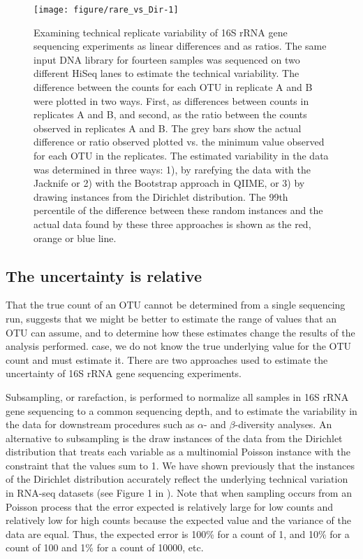 \documentclass[11pt]{article}\usepackage[]{graphicx}\usepackage[]{color}
\makeatletter
\def\maxwidth{ %
  \ifdim\Gin@nat@width>\linewidth
    \linewidth
  \else
    \Gin@nat@width
  \fi
}
\newenvironment{knitrout}{}{} %
\makeatother
\begin{document}
\begin{figure}
\begin{center}

\begin{knitrout}
\color{fgcolor}
\texttt{[image: figure/rare\_vs\_Dir-1]} 

\end{knitrout}
\caption{Examining technical replicate variability of 16S rRNA gene sequencing experiments as linear differences and as ratios. The same input DNA library for fourteen samples was sequenced on two different HiSeq lanes to estimate the technical variability. The difference between the counts for each OTU in replicate A and B were plotted in two ways. First, as differences between counts in replicates A and B, and second, as the ratio between the counts observed in replicates A and B. The grey bars show the actual difference or ratio observed plotted vs. the minimum value observed for each OTU in the replicates. The estimated variability in the data was determined in three ways: 1), by rarefying the data with the Jacknife or 2) with the Bootstrap approach in QIIME, or 3) by drawing instances from the Dirichlet distribution. The 99th percentile of the difference between these random instances and the actual data found by these three approaches is shown as the red, orange or blue line.  }
\label{rarefy}
\end{center}
\end{figure}


\subsection{The uncertainty is relative}

That the true count of an OTU cannot be determined from a single sequencing run, suggests that we might be better to estimate the range of values that an OTU can assume, and to determine how these estimates change the results of the analysis performed.  case, we do not know the true underlying value for the OTU count and must estimate it. There are two approaches used to estimate the uncertainty of 16S rRNA gene sequencing experiments. 

Subsampling, or rarefaction, is performed to normalize all samples in 16S rRNA gene sequencing to a common sequencing depth, and to estimate the variability in the data for downstream procedures such as $\alpha$- and $\beta$-diversity analyses. An alternative to subsampling is the draw instances of the data from the Dirichlet distribution that treats each variable as a multinomial Poisson instance with the constraint that the values sum to 1. We have shown previously that the instances of the Dirichlet distribution accurately reflect the underlying technical variation in RNA-seq datasets (see Figure 1 in \cite{fernandes:2013}). Note that when sampling occurs from an Poisson process that the error expected is relatively large for low counts and relatively low for high counts because the expected value and the variance of the data are equal. Thus, the expected error is 100\% for a count of 1, and 10\% for a count of 100 and 1\% for a count of 10000, etc. 
\end{document}
